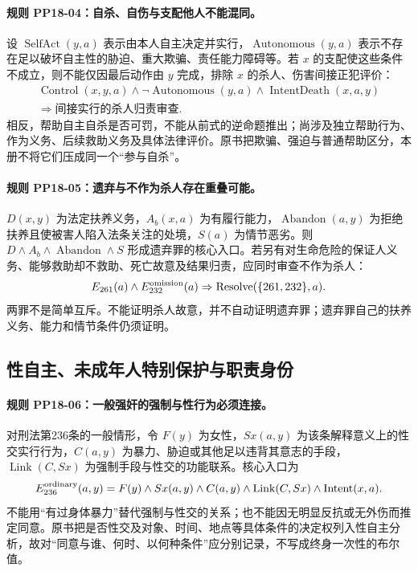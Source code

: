 \paragraph{规则 PP18-04：自杀、自伤与支配他人不能混同。}
\mbox{}\par
设 $\operatorname{SelfAct}(y,a)$ 表示由本人自主决定并实行，$\operatorname{Autonomous}(y,a)$ 表示不存在足以破坏自主性的胁迫、重大欺骗、责任能力障碍等。若 $x$ 的支配使这些条件不成立，则不能仅因最后动作由 $y$ 完成，排除 $x$ 的杀人、伤害间接正犯评价：
\[
\begin{gathered}
\operatorname{Control}(x,y,a)\land\neg\operatorname{Autonomous}(y,a)
\land\operatorname{IntentDeath}(x,a,y)\\
\Rightarrow\text{间接实行的杀人归责审查}.
\end{gathered}
\]
相反，帮助自主自杀是否可罚，不能从前式的逆命题推出；尚涉及独立帮助行为、作为义务、后续救助义务及具体法律评价。原书把欺骗、强迫与普通帮助区分，本册不将它们压成同一个“参与自杀”。

\paragraph{规则 PP18-05：遗弃与不作为杀人存在重叠可能。}
\mbox{}\par
$D(x,y)$ 为法定扶养义务，$A_b(x,a)$ 为有履行能力，$\operatorname{Abandon}(a,y)$ 为拒绝扶养且使被害人陷入法条关注的处境，$S(a)$ 为情节恶劣。则 $D\land A_b\land\operatorname{Abandon}\land S$ 形成遗弃罪的核心入口。若另有对生命危险的保证人义务、能够救助却不救助、死亡故意及结果归责，应同时审查不作为杀人：
\[
E_{261}(a)\land E_{232}^{\rm omission}(a)
\Rightarrow\operatorname{Resolve}(\{261,232\},a).
\]
两罪不是简单互斥。不能证明杀人故意，并不自动证明遗弃罪；遗弃罪自己的扶养义务、能力和情节条件仍须证明。

\subsection{性自主、未成年人特别保护与职责身份}
\paragraph{规则 PP18-06：一般强奸的强制与性行为必须连接。}
\mbox{}\par
对刑法第236条的一般情形，令 $F(y)$ 为女性，$Sx(a,y)$ 为该条解释意义上的性交实行行为，$C(a,y)$ 为暴力、胁迫或其他足以违背其意志的手段，$\operatorname{Link}(C,Sx)$ 为强制手段与性交的功能联系。核心入口为
\[
E_{236}^{\rm ordinary}(a,y)
=F(y)\land Sx(a,y)\land C(a,y)\land\operatorname{Link}(C,Sx)
\land\operatorname{Intent}(x,a).
\]
不能用“有过身体暴力”替代强制与性交的关系；也不能因无明显反抗或无外伤而推定同意。原书把是否性交及对象、时间、地点等具体条件的决定权列入性自主分析，故对“同意与谁、何时、以何种条件”应分别记录，不写成终身一次性的布尔值。

